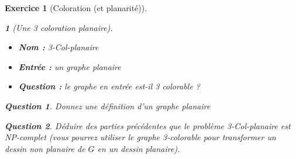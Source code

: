 \documentclass{article}
\theoremstyle{exostyle}
\newtheorem{exo}{Exercice}
\theoremstyle{partiestyle}
\newtheorem{partie}{}[exo]
\theoremstyle{questionstyle}
\newtheorem{questionpartie}{Question}[partie]
\begin{document}
\begin{exo}[Coloration (et planarité)]
\begin{partie}[Une 3 coloration planaire]
	\begin{itemize}
		\item {\bf Nom :} 3-Col-planaire
		\item {\bf Entrée :} un graphe planaire
		\item {\bf Question :} le graphe en entrée est-il 3 colorable ?
	\end{itemize}
		\begin{questionpartie}
			Donnez une définition d'un graphe planaire
		\end{questionpartie}
		\begin{questionpartie}
			Déduire des parties précédentes que le problème 3-Col-planaire est NP-complet (vous pourrez utiliser le graphe 3-colorable pour transformer un dessin non planaire de $G$ en un dessin planaire).
		\end{questionpartie}
		\end{partie}

	
\end{exo}
\end{document}
